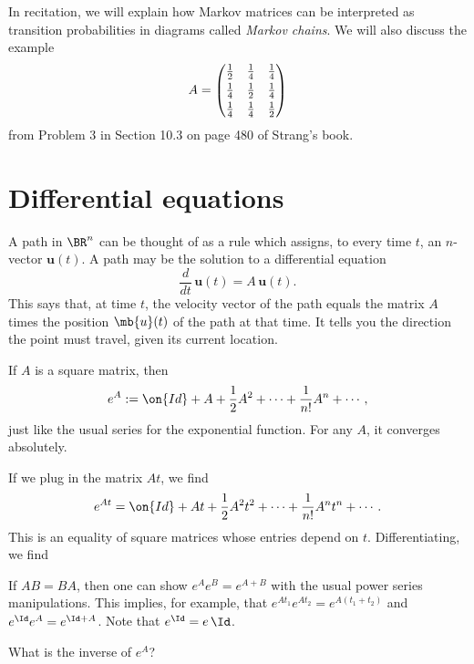 \documentclass[10pt]{amsart}
\theoremstyle{mythm}
\theoremstyle{definition}
\theoremstyle{myrmk}
\begin{document}
	In recitation, we will explain how Markov matrices can be interpreted as transition probabilities in diagrams called \emph{Markov chains}. We will also discuss the example 
	\[
		A = \begin{pmatrix}
		\frac12 & \frac14  & \frac14 \vspace{1mm} \\
			\frac14 & \frac12  & \frac14 \vspace{1mm} \\
				\frac14 & \frac14  & \frac12  
		\end{pmatrix}
	\]
	from Problem 3 in Section 10.3 on page 480 of Strang's book. 
	
	\section{Differential equations} 
	
	A path in $\BR^n$ can be thought of as a rule which assigns, to every time $t$, an $n$-vector $\bm{u}(t)$. A path may be the solution to a differential equation 
	\[
		\frac{d}{dt} \, \bm{u}(t) = A\, \bm{u}(t). 
	\]
	This says that, at time $t$, the velocity vector of the path equals the matrix $A$ times the position $\mb{u}(t)$ of the path at that time. It tells you the direction the point must travel, given its current location. 
	
	 If $A$ is a square matrix, then 
	\[
		e^A := \on{Id} + A + \frac{1}{2} A^2 + \cdots + \frac{1}{n!} A^n + \cdots , 
	\]
	just like the usual series for the exponential function. For any $A$, it converges absolutely. 
	
	If we plug in the matrix $At$, we find 
	\[
		e^{At} = \on{Id} + At + \frac{1}{2} A^2 t^2 + \cdots + \frac{1}{n!} A^n t^n + \cdots . 
	\]
	This is an equality of square matrices whose entries depend on $t$. Differentiating, we find 
	
	If $AB = BA$, then one can show $e^A e^B = e^{A + B}$ with the usual power series manipulations. This implies, for example, that $e^{At_1}e^{At_2} = e^{A(t_1+t_2)}$ and $e^{\Id} e^{A} = e^{\Id + A}$. Note that $e^{\Id} = e\, \Id$. 
	
	 What is the inverse of $e^{A}$? 
	
\end{document}
